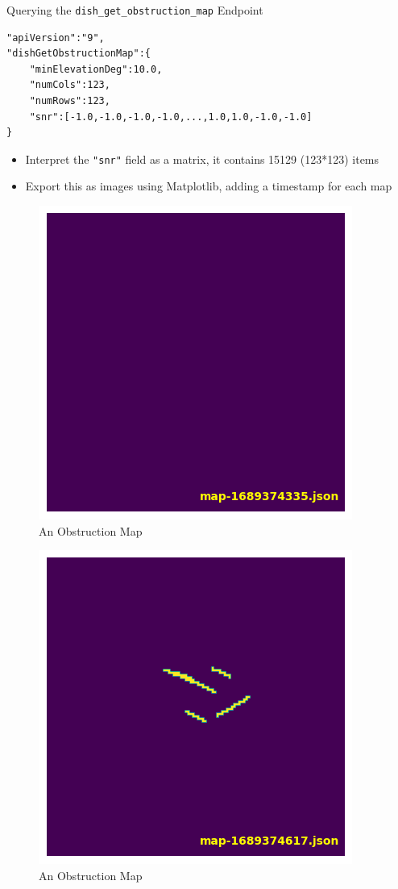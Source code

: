 \documentclass[NET,english,beameralt]{tumbeamer}
\begin{document}
\begin{frame}[fragile]{Querying the \texttt{dish\_get\_obstruction\_map} Endpoint }
    \begin{lstlisting}
"apiVersion":"9",
"dishGetObstructionMap":{
    "minElevationDeg":10.0,
    "numCols":123,
    "numRows":123,
    "snr":[-1.0,-1.0,-1.0,-1.0,...,1.0,1.0,-1.0,-1.0]
}
    \end{lstlisting}
    \begin{itemize}
        \item Interpret the \texttt{"snr"} field as a matrix, it contains 15129 (123*123) items
        \item Export this as images using Matplotlib, adding a timestamp for each map
    \end{itemize}
\end{frame}

\begin{frame}[fragile]
    \begin{figure}
        \includegraphics[width=0.4\columnwidth]{pics/map1.png}
        \caption{An Obstruction Map}
    \end{figure}
\end{frame}

\begin{frame}[fragile]
    \begin{figure}
        \includegraphics[width=0.4\columnwidth]{pics/map2.png}
        \caption{An Obstruction Map}
    \end{figure}
\end{frame}
\end{document}
